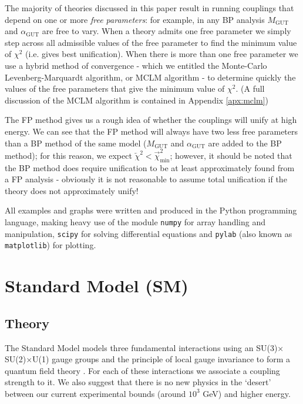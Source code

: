 \documentclass[12pt,a4paper,oneside]{article}
\begin{document}
The majority of theories discussed in this paper result in running couplings that depend on one or more \textit{free parameters}: for example, in any BP analysis $M_\mathrm{GUT}$ and $\alpha_\mathrm{GUT}$ are free to vary. When a theory admits one free parameter we simply step across all admissible values of the free parameter to find the minimum value of $\chi^2$ (i.e. gives best unification). When there is more than one free parameter we use a hybrid method of convergence - which we entitled the Monte-Carlo Levenberg-Marquardt algorithm, or MCLM algorithm - to determine quickly the values of the free parameters that give the minimum value of $\chi^2$. (A full discussion of the MCLM algorithm is contained in Appendix \ref{apx:mclm})

The FP method gives us a rough idea of whether the couplings will unify at high energy. We can see that the FP method will always have two less free parameters than a BP method of the same model ($M_\mathrm{GUT}$ and $\alpha_\mathrm{GUT}$ are added to the BP method); for this reason, we expect $\overleftarrow{\chi}^2 < \overrightarrow{\chi}^2_\mathrm{min}$; however, it should be noted that the BP method does require unification to be at least approximately found from a FP analysis - obviously it is not reasonable to assume total unification if the theory does not approximately unify!

All examples and graphs were written and produced in the Python programming language, making heavy use of the module \texttt{numpy} \cite{scipy} for array handling and manipulation, \texttt{scipy} \cite{scipy} for solving differential equations and \texttt{pylab} (also known as \texttt{matplotlib}) \cite{pylab} for plotting.

\section{Standard Model (SM)}
\label{sec:sm}

\subsection{Theory}

The Standard Model models three fundamental interactions using an SU(3)$\times$SU(2)$\times$U(1) gauge groups and the principle of local gauge invariance to form a quantum field theory \cite{sm}. For each of these interactions we associate a coupling strength to it. We also suggest that there is no new physics in the `desert' between our current experimental bounds (around $10^3$ GeV) and higher energy.
\end{document}
